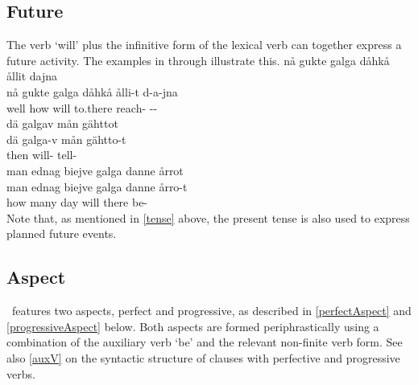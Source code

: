 \subsection{Future}\label{futureTense}
The verb  ‘will’ plus the infinitive form of the lexical verb can together express a future activity. The examples in  through  illustrate this.
\ea\label{futureTenseEx1}%
\glll	nå gukte galga dåhkå ållit dajna\\
	nå gukte galga dåhkå ålli-t d-a-jna\\
	well how will\BS{} to.there reach- --\\\nopagebreak
{}	
\z
\ea\label{futureTenseEx2}%
\glll	dä galgav mån gähttot\\
	dä galga-v mån gähtto-t\\
	then will-  tell-\\\nopagebreak
{}	
\z
\ea\label{futureTenseEx3}%
\glll	man ednag biejve galga danne årrot\\
	man ednag biejve galga danne årro-t\\
	how many day\BS{} will\BS{} there be-\\\nopagebreak
{}	
\z
Note that, as mentioned in \SEC\ref{tense} above, the present tense is also used to express planned future events. 

\subsection{Aspect}\label{aspect}
\PS\ features two aspects, perfect and progressive, as described in \SEC\ref{perfectAspect} and \SEC\ref{progressiveAspect} below. Both aspects are formed periphrastically using a combination of the auxiliary verb  ‘be’ and the relevant non-finite verb form. 
See also \SEC\ref{auxV} on the syntactic structure of clauses with perfective and progressive verbs. 

